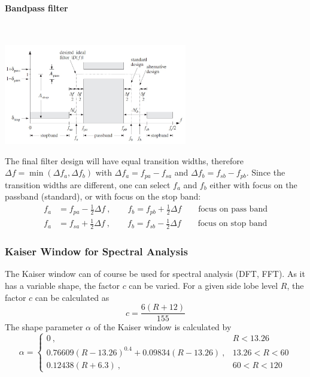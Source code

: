 \paragraph{Bandpass filter}~\\
\begin{center}
	\includegraphics[width=8cm]{images/FIR_KaiserBP.jpg}
\end{center}
The final filter design will have equal transition widths, therefore
$\Delta f = \min(\Delta f_a, \Delta f_b)$ with $\Delta f_a=f_{pa}-f_{sa}$
and $\Delta f_b=f_{sb}-f_{pb}$.
Since the transition widths are different, one can select $f_a$ and $f_b$ either
with focus on the passband (standard), or with focus on the stop band:
\begin{align*}
	f_a &= f_{pa} - \frac{1}{2} \Delta f \:, \qquad f_b = f_{pb} + \frac{1}{2} \Delta f \qquad \text{focus on pass band}\\
	f_a &= f_{sa} + \frac{1}{2} \Delta f \:, \qquad f_b = f_{sb} - \frac{1}{2} \Delta f \qquad \text{focus on stop band}
\end{align*}

\subsubsection{Kaiser Window for Spectral Analysis}
The Kaiser window can of course be used for spectral analysis (DFT, FFT). As it
has a variable shape, the factor $c$ can be varied. For a given side lobe level
$R$, the factor $c$ can be calculated as
\begin{equation*}
	c = \frac{6 \left(R + 12\right)}{155}
\end{equation*}
The shape parameter $\alpha$ of the Kaiser window is calculated by
\begin{equation*}
	\alpha = \begin{cases}
		0\:, & R < 13.26 \\
		0.76609(R-13.26)^{0.4}+0.09834(R-13.26)\:, & 13.26 < R < 60 \\
		0.12438 (R+6.3)\:, & 60 < R < 120
	\end{cases}
\end{equation*}

